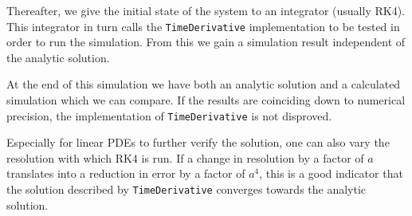 Thereafter, we give the initial state of the system to an integrator (usually RK4).
This integrator in turn calls the \texttt{TimeDerivative} implementation to be tested in order to run the simulation.
From this we gain a simulation result independent of the analytic solution.

At the end of this simulation we have both an analytic solution and a calculated simulation which we can compare.
If the results are coinciding down to numerical precision, the implementation of \texttt{TimeDerivative} is not disproved.

Especially for linear PDEs to further verify the solution, one can also vary the resolution with which RK4 is run.
If a change in resolution by a factor of $a$ translates into a reduction in error by a factor of $a^4$, this is a good indicator that the solution described by \texttt{TimeDerivative} converges towards the analytic solution.

